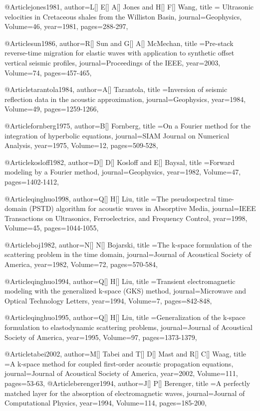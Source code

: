 @Article{jones1981,
  author={L[] E[] A[] Jones and H[] F[] Wang},
  title = {Ultrasonic velocities in Cretaceous shales from the Williston Basin},
  journal={Geophysics},
  Volume=46,
  year=1981,
  pages={288-297},
}


@Article{sun1986,
  author={R[] Sun and G[] A[] McMechan},
  title ={Pre-stack reverse-time migration for elastic waves with application to synthetic offset vertical seismic profiles},
  journal={Proceedings of the IEEE},
  year=2003,
  Volume=74,
  pages={457-465},
}

@Article{tarantola1984,
  author={A[] Tarantola},
  title ={Inversion of seismic reflection data in the acoustic approximation},
  journal={Geophysics},
  year=1984,
  Volume=49,
  pages={1259-1266},
}

@Article{fornberg1975,
  author={B[] Fornberg},
  title ={On a {F}ourier method for the integration of hyperbolic equations},
  journal={SIAM Journal on Numerical Analysis},
  year=1975,
  Volume=12,
  pages={509-528},
}

@Article{kosloff1982,
  author={D[] D[] Kosloff and E[] Baysal},
  title ={Forward modeling by a {F}ourier method},
  journal={Geophysics},
  year=1982,
  Volume=47,
  pages={1402-1412},
}

@Article{qinghuo1998,
  author={Q[] H[] Liu},
  title ={The pseudospectral time-domain (PSTD) algorithm for acoustic waves in Absorptive Media},
  journal={IEEE Transactions on Ultrasonics, Ferroelectrics, and Frequency Control},
  year=1998,
  Volume=45,
  pages={1044-1055},
}

@Article{boj1982,
  author={N[] N[] Bojarski},
  title ={The k-space formulation of the scattering problem in the time domain},
  journal={Journal of Acoustical Society of America},
  year=1982,
  Volume=72,
  pages={570-584},
}


@Article{qinghuo1994,
  author={Q[] H[] Liu},
  title ={Transient electromagnetic modeling with the generalized k-space (GKS) method},
  journal={Microwave and Optical Technology Letters},
  year=1994,
  Volume=7,
  pages={842-848},
}

@Article{qinghuo1995,
  author={Q[] H[] Liu},
  title ={Generalization of the k-space formulation to elastodynamic scattering problems},
  journal={Journal of Acoustical Society of America},
  year=1995,
  Volume=97,
  pages={1373-1379},
}

@Article{tabei2002,
  author={M[] Tabei and T[] D[] Mast and R[] C[] Waag},
  title ={A k-space method for coupled first-order acoustic propagation equations},
  journal={Journal of Acoustical Society of America},
  year=2002,
  Volume=111,
  pages={53-63},
}
@Article{berenger1994,
  author={J[] P[] Berenger},
  title ={A perfectly matched layer for the absorption of electromagnetic waves},
  journal={Journal of Computational Physics},
  year=1994,
  Volume=114,
  pages={185-200},
}

